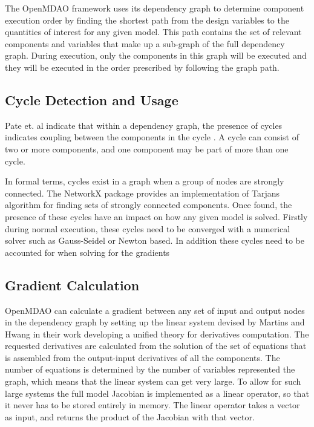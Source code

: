 \documentclass[]{aiaa-tc} %
\begin{document}
    The OpenMDAO framework uses its dependency graph to determine component execution order by finding the 
    shortest path from the design variables to the quantities of interest for any given model\cite{openmdao_derivatives}. 
    This path contains the set of relevant components and variables that make up a sub-graph of the full
    dependency graph. During execution, only the components in this graph will be executed and they will be executed 
    in the order prescribed by following the graph path. 

    \subsection{Cycle Detection and Usage}
    Pate et. al indicate that within a dependency graph, the presence of cycles indicates coupling between
    the components in the cycle \cite{graph_problem2013}. A cycle can consist of two or more components, and
    one component may be part of more than one cycle.

    In formal terms, cycles exist in a graph when a group of nodes are strongly connected. The NetworkX package
    provides an implementation of Tarjans algorithm for finding sets of strongly connected
    components\cite{tarjan1972depth,nuutila1994finding}. Once found, the presence of these cycles
    have an impact on how any given model is solved. Firstly during normal execution, these cycles
    need to be converged with a numerical solver such as Gauss-Seidel or Newton based. 
    In addition these cycles need to be accounted for when solving for the gradients 

    \subsection{Gradient Calculation}
    
    OpenMDAO can calculate a gradient between any set of input and output nodes in the
    dependency graph by setting up the linear system devised by Martins and Hwang \cite{Martins2012} in their 
    work developing a unified theory for derivatives computation. 
    The requested derivatives are calculated from the solution of the set of equations that is assembled
    from the output-input derivatives of all the components. The number of equations 
    is determined by the number of variables represented the graph, which means that the linear 
    system can get very large. To allow for such large systems the full model Jacobian is implemented as 
    a linear operator, so that it never has to be stored entirely in memory. The
    linear operator takes a vector as input, and returns the product of the Jacobian with that vector.
    
\end{document}
